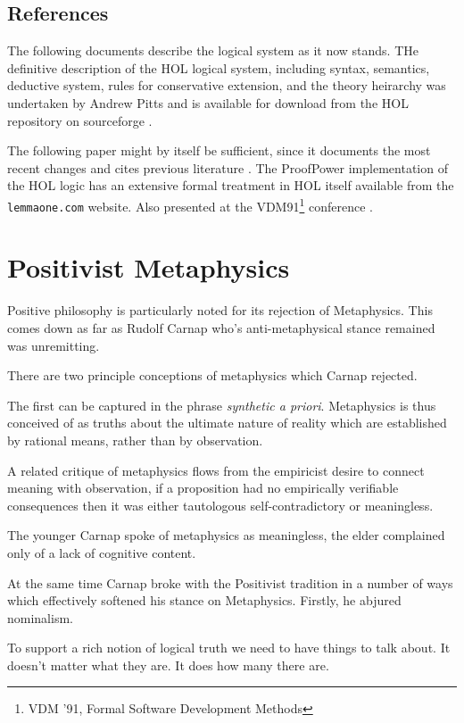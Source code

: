 \documentclass[10pt,titlepage]{book}
\begin{document}
\subsection{References}

  The following documents describe the logical system as it now stands.
  THe definitive description of the HOL logical system, including syntax, semantics, deductive system, rules for conservative extension, and the theory heirarchy was undertaken by Andrew Pitts and is available for download from the HOL repository on sourceforge \cite{pittsHOLlogic}.
  
  The following paper might by itself be sufficient, since it documents the most recent changes and cites previous literature \cite{arthan2016}.
  The ProofPower implementation of the HOL logic has an extensive formal treatment in HOL itself 
  \cite{arthanspc001,arthanspc002,arthanspc003,arthanspc004,arthanspc005} available from the {\tt lemmaone.com} website.
  Also presented at the VDM91\footnote{VDM ’91, Formal Software Development Methods} conference \cite{arthan91}.
  
\section{Positivist Metaphysics}

Positive philosophy is particularly noted for its rejection of Metaphysics.
This comes down as far as Rudolf Carnap who's anti-metaphysical stance remained was unremitting.

There are two principle conceptions of metaphysics which Carnap rejected.

The first can be captured in the phrase \emph{synthetic a priori}.
Metaphysics is thus conceived of as truths about the ultimate nature of reality which are established by rational means, rather than by observation.

A related critique of metaphysics flows from the empiricist desire to connect meaning with observation, if a proposition had no empirically verifiable consequences then it was either tautologous self-contradictory or meaningless.

The younger Carnap spoke of metaphysics as meaningless, the elder complained only of a lack of cognitive content.

At the same time Carnap broke with the Positivist tradition in a number of ways which effectively softened his stance on Metaphysics.
Firstly, he abjured nominalism.

To support a rich notion of logical truth we need to have things to talk about.
It doesn't matter what they are.
It does how many there are.
\end{document}
